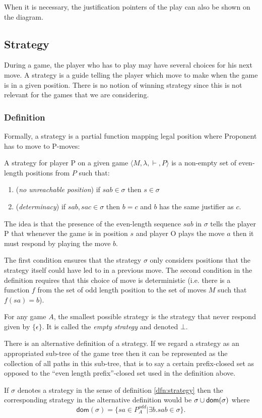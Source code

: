 When it is necessary, the justification pointers of the play can also
be shown on the diagram.


\subsection{Strategy}

During a game, the player who has to play may have several choices
for his next move. A strategy is a guide telling the player which move to make when the
game is in a given position. There is no notion of winning strategy since this is
not relevant for the games that we are considering.

\subsubsection{Definition}
Formally, a strategy is a partial function mapping legal position where Proponent has to move
to P-moves:
\begin{dfn}[Strategy]
\label{dfn:strategy}
A strategy for player P on a given game $\langle M, \lambda, \vdash, P \rangle$ is a
non-empty set of even-length positions from $P$ such that:
\begin{enumerate}
\item (\emph{no unreachable position}) if $sab \in \sigma$ then $s \in \sigma$
\item (\emph{determinacy}) if $sab, sac \in \sigma$ then $b = c$  and $b$ has the same justifier as
$c$.
\end{enumerate}
\end{dfn}

The idea is that the presence of the even-length sequence $s a b$ in
$\sigma$ tells the player P that whenever the game is in position
$s$ and player O plays the move $a$ then it must respond by playing
the move $b$.

The first condition ensures that the strategy $\sigma$ only
considers positions that the strategy itself could have led to in a
previous move. The second condition in the definition requires that
this choice of move is deterministic (i.e. there is a function $f$
from the set of odd length position to the set of moves $M$ such
that $f(s a) = b$).


For any game $A$, the smallest possible strategy is the strategy
that never respond given by $\{ \epsilon \}$. It is called the
\emph{empty strategy} and denoted $\bot$.


\begin{rem}
\label{rem:atlern_strategy}
There is an alternative definition of a strategy.
If we regard a strategy as an appropriated sub-tree of the game tree then
it can be represented as the collection of all paths in this sub-tree, that is to say a certain prefix-closed set
as opposed to the ``even length prefix''-closed set used in the definition above.

If $\sigma$ denotes a strategy in the sense of definition \ref{dfn:strategy} then the corresponding strategy in the alternative definition would be
$\sigma \cup \textsf{dom}(\sigma)$ where
$$\textsf{dom}(\sigma) = \{ sa \in P_A^{odd} | \exists b . sab \in \sigma \}.$$
\end{rem}


